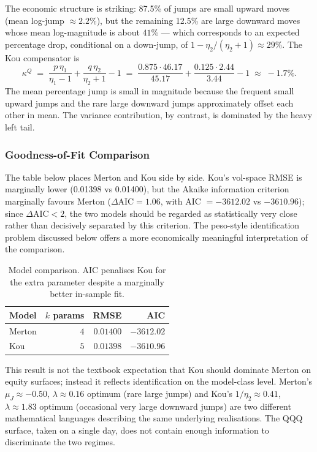 \documentclass[12pt]{article}
\begin{document}
The economic structure is striking: 87.5\% of jumps are small upward
moves (mean log-jump $\approx 2.2\%$), but the remaining 12.5\% are
large downward moves whose mean log-magnitude is about $41\%$ --- which
corresponds to an expected percentage drop, conditional on a down-jump,
of $1 - \eta_2/(\eta_2 + 1) \approx 29\%$. The Kou compensator is
\[
   \kappa^Q \;=\; \frac{p\,\eta_1}{\eta_1 - 1}
                 + \frac{q\,\eta_2}{\eta_2 + 1} - 1
              \;=\; \frac{0.875 \cdot 46.17}{45.17}
                  + \frac{0.125 \cdot 2.44}{3.44} - 1
              \;\approx\; -1.7\%.
\]
The mean percentage jump is small in magnitude because the frequent
small upward jumps and the rare large downward jumps approximately
offset each other in mean. The variance contribution, by contrast, is
dominated by the heavy left tail.

\subsubsection*{Goodness-of-Fit Comparison}

The table below places Merton and Kou side by side. Kou's vol-space
RMSE is marginally lower (0.01398 vs 0.01400), but the Akaike
information criterion marginally favours Merton ($\Delta\text{AIC} =
1.06$, with AIC $= -3612.02$ vs $-3610.96$); since $\Delta\text{AIC} < 2$,
the two models should be regarded as statistically very close rather
than decisively separated by this criterion. The peso-style
identification problem discussed below offers a more economically
meaningful interpretation of the comparison.

\begin{table}[H]
\centering
\caption{Model comparison. AIC penalises Kou for the extra parameter
despite a marginally better in-sample fit.}
\begin{tabular}{lrrr}
\toprule
Model  & $k$ params & RMSE     & AIC        \\
\midrule
Merton & $4$        & $0.01400$ & $-3612.02$ \\
Kou    & $5$        & $0.01398$ & $-3610.96$ \\
\bottomrule
\end{tabular}
\end{table}

This result is not the textbook expectation that Kou should dominate
Merton on equity surfaces; instead it reflects identification on the
model-class level. Merton's $\mu_J \approx -0.50$,
$\lambda \approx 0.16$ optimum (rare large jumps) and Kou's
$1/\eta_2 \approx 0.41$, $\lambda \approx 1.83$ optimum (occasional
very large downward jumps) are two different mathematical languages
describing the same underlying realisations. The QQQ surface, taken on
a single day, does not contain enough information to discriminate the
two regimes.
\end{document}
